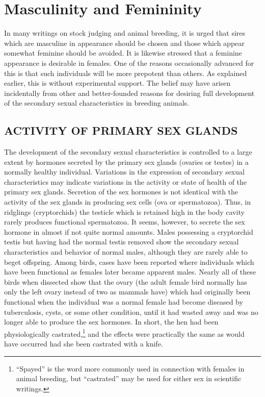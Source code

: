 \chapter{Masculinity and Femininity}
\label{cha:Lush_Chapter_34}

In many writings on stock judging and animal breeding, it is urged
that sires which are masculine in appearance should be chosen and
those which appear somewhat feminine should be avoided. It is likewise
stressed that a feminine appearance is desirable in females. One of the
reasons occasionally advanced for this is that such individuals will be
more prepotent than others. As explained earlier, this is without experimental
support. The belief may have arisen incidentally from other
and better-founded reasons for desiring full development of the secondary
sexual characteristics in breeding animals.

\section*{ACTIVITY OF PRIMARY SEX GLANDS}

The development of the secondary sexual characteristics is controlled
to a large extent by hormones secreted by the primary sex glands
(ovaries or testes) in a normally healthy individual. Variations in the
expression of secondary sexual characteristics may indicate variations in
the activity or state of health of the primary sex glands. Secretion of the
sex hormones is not identical with the activity of the sex glands in producing
sex cells (ova or spermatozoa). Thus, in ridglings (cryptorchids)
the testicle which is retained high in the body cavity rarely produces
functional spermatozoa. It seems, however, to secrete the sex hormone
in almost if not quite normal amounts. Males possessing a cryptorchid
testis but having had the normal testis removed show the secondary
sexual characteristics and behavior of normal males, although they are
rarely able to beget offspring. Among birds, cases have been reported
where individuals which have been functional as females later became
apparent males. Nearly all of these birds when dissected show that the
ovary (the adult female bird normally has only the left ovary instead of
two as mammals have) which had originally been functional when the
individual was a normal female had become diseased by tuberculosis,
cysts, or some other condition, until it had wasted away and was no
longer able to produce the sex hormones. In short, the hen had been
physiologically castrated,\footnote{``Spayed'' is the word more commonly
used in connection with females in animal breeding, but ``castrated''
may be used for either sex in scientific writings.} and the effects
were practically the same as would have occurred had she been castrated
with a knife.

